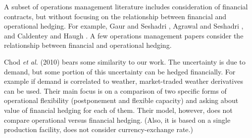 \documentclass[mnsc,nonblindrev,copyedit]{informs2_wz} %
\newcommand{\OUT}[1]{}
\begin{document}
A subset of operations management literature includes consideration of financial contracts, but without focusing on the relationship between financial and operational hedging.  For example, Gaur and Seshadri \cite{Guar2004}, Agrawal and Seshadri \cite{Agrawal2000}, and Caldentey and Haugh \cite{Caldentey}.  
\OUT{
Gaur and Seshadri \cite{Guar2004} consider a single-period one-facility model with demand and financial asset values being correlated.  Their purpose is to construct the optimal financial hedging contract.  Agrawal and Seshadri \cite{Agrawal2000} investigate joint price and production decisions in similar settings, when demand and financial asset values have correlation and find corresponding optimal hedging contract. Caldentey and Haugh \cite{Caldentey} study financial hedging in an incomplete market, where one financial asset and one operational value follow continuous-time correlated diffusion processes and a mean-variance objective function is used.  
} A few operations management papers consider the relationship between financial and operational hedging.

Chod {\it et al.} (2010) bears some similarity to our work.  The uncertainty is due to demand, but some portion of this uncertainty can be hedged financially.  For example if demand is correlated to weather, market-traded weather derivatives can be used.  Their main focus is on a comparison of two specific forms of operational flexibility (postponement and flexible capacity) and asking about value of financial hedging for each of them.  Their model, however, does not compare operational versus financial hedging.  (Also, it is based on a single production facility, does not consider currency-exchange rate.) 
\end{document}
